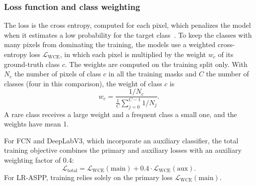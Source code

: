 \subsubsection{Loss function and class weighting}
The loss is the cross entropy, computed for each pixel, which penalizes the model when it estimates a low probability for the target class~\cite{geron2026handson}. To keep the classes with many pixels from dominating the training, the models use a weighted cross-entropy loss $\mathcal{L}_{\text{WCE}}$, in which each pixel is multiplied by the weight $w_c$ of its ground-truth class $c$. The weights are computed on the training split only. With $N_c$ the number of pixels of class $c$ in all the training masks and $C$ the number of classes (four in this comparison), the weight of class $c$ is
\begin{equation}
    w_c = \frac{1/N_c}{\frac{1}{C}\sum_{j=0}^{C-1} 1/N_j}.
    \label{eq:class_weights_norm}
\end{equation}
A rare class receives a large weight and a frequent class a small one, and the weights have mean 1.

For FCN and DeepLabV3, which incorporate an auxiliary classifier, the total training objective combines the primary and auxiliary losses with an auxiliary weighting factor of $0.4$:
\begin{equation}
    \mathcal{L}_{\text{total}} = \mathcal{L}_{\text{WCE}}(\text{main}) + 0.4 \cdot \mathcal{L}_{\text{WCE}}(\text{aux}).
    \label{eq:total_training_loss}
\end{equation}
For LR-ASPP, training relies solely on the primary loss $\mathcal{L}_{\text{WCE}}(\text{main})$.

